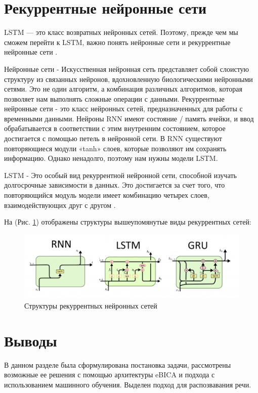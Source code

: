 \section{Рекуррентные нейронные сети}

LSTM — это класс возвратных нейронных сетей. Поэтому, прежде чем мы сможем перейти к LSTM, 
важно понять нейронные сети и рекуррентные нейронные сети \cite{Wikipedia01}. 

Нейронные сети - Искусственная нейронная сеть представляет собой слоистую структуру из связанных нейронов,
вдохновленную биологическими нейронными сетями. Это не один алгоритм, а комбинация различных алгоритмов, 
которая позволяет нам выполнять сложные операции с данными. 
Рекуррентные нейронные сети - это класс нейронных сетей, предназначенных для работы с временными данными. 
Нейроны RNN имеют состояние / память ячейки, и ввод обрабатывается в соответствии 
с этим внутренним состоянием, которое достигается с помощью петель в нейронной сети. 
В RNN существуют повторяющиеся модули «tanh» слоев, которые позволяют им сохранять информацию. 
Однако ненадолго, поэтому нам нужны модели LSTM. 

LSTM - Это особый вид рекуррентной нейронной сети, способной изучать долгосрочные зависимости в данных. 
Это достигается за счет того, что повторяющийся модуль модели имеет комбинацию четырех слоев, взаимодействующих друг с другом \cite{Wikipedia01}. 

На (Рис. \ref{pic:ris9}) отображены структуры вышеупомянутые виды рекуррентных сетей: 

\begin{figure}[h]
\includegraphics[width=0.75\columnwidth]{./img/ris9.png}
\centering
\caption{Структуры рекуррентных нейронных сетей}
\label{pic:ris9}
\end{figure}

\section{Выводы}

В данном разделе была сформулирована постановка задачи, рассмотрены возможные ее решения с помощью архитектуры eBICA и подхода с использованием машинного обучения. 
Выделен подход для распозвавания речи.
